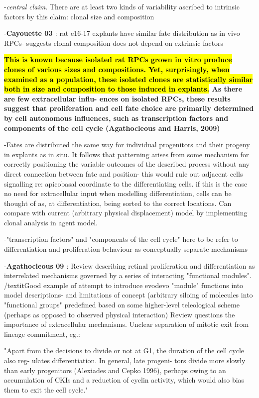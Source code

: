 \bigskip
-\textit{central claim}. There are at least two kinds of variability ascribed to intrinsic factors by this claim: clonal size and composition

-\textbf{Cayouette 03 \cite{Cayouette2003}}: rat e16-17 explants have similar fate distribution as in vivo RPCs- suggests clonal composition does not depend on extrinsic factors

\bigskip
\textbf{\hl{This is known because isolated rat RPCs
grown in vitro produce clones of various sizes and compositions.
Yet, surprisingly, when examined as a population, these isolated
clones are statistically similar both in size and composition to
those induced in explants.} As there are few extracellular influ-
ences on isolated RPCs, these results suggest that proliferation
and cell fate choice are primarily determined by cell autonomous
influences, such as transcription factors and components of the
cell cycle (Agathocleous and Harris, 2009)}

\bigskip
-Fates are distributed the same way for individual progenitors and their progeny in explants as in situ. It follows that patterning arises from some mechanism for correctly positioning the variable outcomes of the described process without any direct connection between fate and position- this would rule out adjacent cells signalling re: apicobasal coordinate to the differentiating cells. if this is the case no need for extracellular input when modelling differentiation, cells can be thought of as, at differentiation, being sorted to the correct locations. Can compare with current (arbitrary physical displacement) model by implementing clonal analysis in agent model.

-"transcription factors" and "components of the cell cycle" here to be refer to differentiation and proliferation behaviour as conceptually separate mechanisms

-\textbf{Agathocleous 09 \cite{Agathocleous2009}}: Review describing retinal proliferation and differentiation as interrelated mechanisms governed by a series of interacting "functional modules". /textit{Good example of attempt to introduce evodevo "module" functions into model descriptions- and limitations of concept (arbitrary siloing of molecules into "functional groups" predefined based on some higher-level teleological scheme (perhaps as opposed to observed physical interaction)} Review questions the importance of extracellular mechanisms. Unclear separation of mitotic exit from lineage commitment, eg.:

"Apart from the decisions to divide or not
at G1, the duration of the cell cycle also reg-
ulates differentiation. In general, late progeni-
tors divide more slowly than early progenitors
(Alexiades and Cepko 1996), perhaps owing to
an accumulation of CKIs and a reduction of
cyclin activity, which would also bias them to
exit the cell cycle."


